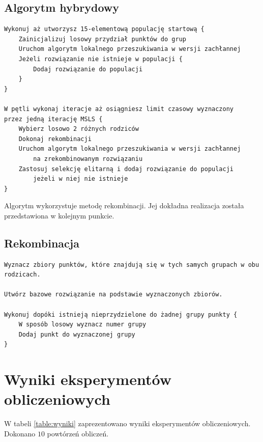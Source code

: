 \documentclass[main.tex]{subfiles}
\begin{document}
\subsection{Algorytm hybrydowy}
\begin{verbatim}
Wykonuj aż utworzysz 15-elementową populację startową {
    Zainicjalizuj losowy przydział punktów do grup
    Uruchom algorytm lokalnego przeszukiwania w wersji zachłannej
    Jeżeli rozwiązanie nie istnieje w populacji {
        Dodaj rozwiązanie do populacji
    }
}

W pętli wykonaj iteracje aż osiągniesz limit czasowy wyznaczony
przez jedną iterację MSLS {
    Wybierz losowo 2 różnych rodziców
    Dokonaj rekombinacji
    Uruchom algorytm lokalnego przeszukiwania w wersji zachłannej
        na zrekombinowanym rozwiązaniu
    Zastosuj selekcję elitarną i dodaj rozwiązanie do populacji
        jeżeli w niej nie istnieje
}
\end{verbatim}
Algorytm wykorzystuje metodę rekombinacji. Jej dokładna realizacja została przedstawiona w kolejnym punkcie.

\subsection{Rekombinacja}
\begin{verbatim}
Wyznacz zbiory punktów, które znajdują się w tych samych grupach w obu rodzicach.

Utwórz bazowe rozwiązanie na podstawie wyznaczonych zbiorów.

Wykonuj dopóki istnieją nieprzydzielone do żadnej grupy punkty {
    W sposób losowy wyznacz numer grupy
    Dodaj punkt do wyznaczonej grupy
}
\end{verbatim}

\section{Wyniki eksperymentów obliczeniowych}
\label{section:wyniki}

W tabeli \ref{table:wyniki} zaprezentowano wyniki eksperymentów obliczeniowych. Dokonano $10$ powtórzeń obliczeń.
\end{document}
